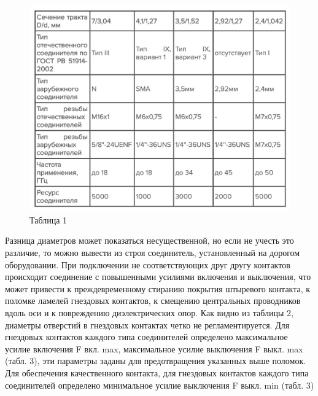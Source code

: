 \documentclass[%
	11pt,
	a4paper,
	utf8,
		]{article}
\begin{document}
\begin{figure}[h]
	\centering
	\includegraphics[scale=0.5]{figures/SVCH_table_1.png}
	\caption{Таблица 1}\label{fig:SVCH_table_1}
\end{figure}

Разница диаметров может показаться несущественной, но если не учесть это различие, то можно вывести из строя соединитель, установленный на дорогом оборудовании. При подключении не соответствующих друг другу контактов происходит соединение с повышенными усилиями включения и выключения, что может привести к преждевременному стиранию покрытия штыревого контакта, к поломке ламелей гнездовых контактов, к смещению центральных проводников вдоль оси и к повреждению диэлектрических опор. Как видно из таблицы 2, диаметры отверстий в гнездовых контактах четко не регламентируется. Для гнездовых контактов каждого типа соединителей определено максимальное усилие включения F вкл. max, максимальное усилие выключения F выкл. max (табл. 3), эти параметры заданы для предотвращения указанных выше поломок. Для обеспечения качественного контакта, для гнездовых контактов каждого типа соединителей определено минимальное усилие выключения F выкл. min (табл. 3)
\end{document}
